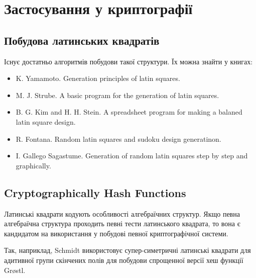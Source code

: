 \chapter{Застосування у криптографії}

\section{Побудова латинських квадратів}
Існує достатньо алгоритмів побудови такої структури. Їх можна знайти у книгах:
\begin{itemize}
    \item K. Yamamoto. Generation principles of latin squares.
    \item M. J. Strube. A basic program for the generation of latin squares.
    \item B. G. Kim and H. H. Stein. A spreadsheet program for making a balaned latin square design.
    \item R. Fontana. Random latin squares and sudoku design generatinon.
    \item I. Gallego Sagastume. Generation of random latin squares step by step and graphically.
\end{itemize}

\section{Cryptographically Hash Functions}

Латинські квадрати кодують особливості алгебраїчних структур. Якщо певна алгебраїчна структура проходить певні тести латинського квадрата, то вона є кандидатом на використання у побудові певної криптографічної системи.

Так, наприклад, Schmidt \cite{schmidt} використовує супер-симетричні латинські квадрати для адитивної групи скінчених полів для побудови спрощенної версії хеш функції Grøstl.
